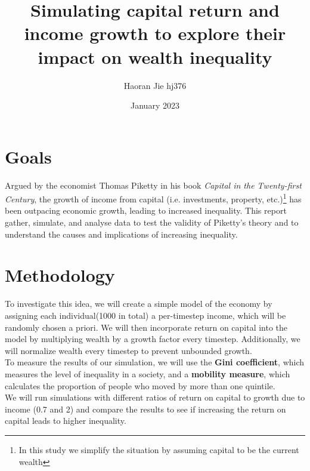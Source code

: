 \documentclass{article}
\title{Simulating capital return and income growth to explore their impact on wealth inequality
}
\author{Haoran Jie hj376}
\date{January 2023}
\begin{document}
\maketitle


\section*{Goals}
Argued by the economist Thomas Piketty in his book \textit{Capital in the Twenty-first Century}, the growth of income from capital (i.e. investments, property, etc.)\footnote{In this study we simplify the situation by assuming capital to be the current wealth} has been outpacing economic growth, leading to increased inequality. This report gather, simulate, and analyse data to test the validity of Piketty's theory and to understand the causes and implications of increasing inequality.
\vspace{-0.4cm}
\section*{Methodology}
\vspace{-0.3cm}
To investigate this idea, we will create a simple model of the economy by assigning each individual(1000 in total) a per-timestep income, 
which will be randomly chosen a priori. We will then incorporate return on capital into the model by multiplying wealth by a growth factor every timestep.
Additionally, we will normalize wealth every timestep to prevent unbounded growth.\\
To measure the results of our simulation, we will use the \textbf{Gini coefficient}, which measures the level of inequality in a society, 
and a \textbf{mobility measure}, which calculates the proportion of people who moved by more than one quintile.\\
We will run simulations with different ratios of return on capital to growth due to income (0.7 and 2) and compare the results to see if increasing the return on capital leads to higher inequality.

\vspace{-0.4cm}



\end{document}
